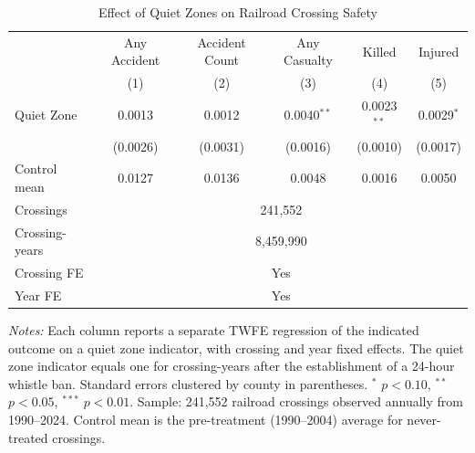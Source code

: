 \begin{table}[t]
\centering
\caption{Effect of Quiet Zones on Railroad Crossing Safety}
\label{tab:main}
\begin{threeparttable}
\begin{tabular}{lccccc}
\hline\hline
 & Any Accident & Accident Count & Any Casualty & Killed & Injured \\
 & (1) & (2) & (3) & (4) & (5) \\
\hline
\addlinespace
Quiet Zone & 0.0013 & 0.0012 & 0.0040$^{**}$ & 0.0023$^{**}$ & 0.0029$^{*}$ \\
 & (0.0026) & (0.0031) & (0.0016) & (0.0010) & (0.0017) \\
\addlinespace
\hline
Control mean & 0.0127 & 0.0136 & 0.0048 & 0.0016 & 0.0050 \\
Crossings & \multicolumn{5}{c}{241,552} \\
Crossing-years & \multicolumn{5}{c}{8,459,990} \\
Crossing FE & \multicolumn{5}{c}{Yes} \\
Year FE & \multicolumn{5}{c}{Yes} \\
\hline\hline
\end{tabular}
\begin{tablenotes}[flushleft]
\small
\item \textit{Notes:} Each column reports a separate TWFE regression of the indicated outcome on a quiet zone indicator, with crossing and year fixed effects. The quiet zone indicator equals one for crossing-years after the establishment of a 24-hour whistle ban. Standard errors clustered by county in parentheses. $^{*}$ $p < 0.10$, $^{**}$ $p < 0.05$, $^{***}$ $p < 0.01$. Sample: 241,552 railroad crossings observed annually from 1990--2024. Control mean is the pre-treatment (1990--2004) average for never-treated crossings.
\end{tablenotes}
\end{threeparttable}
\end{table}
